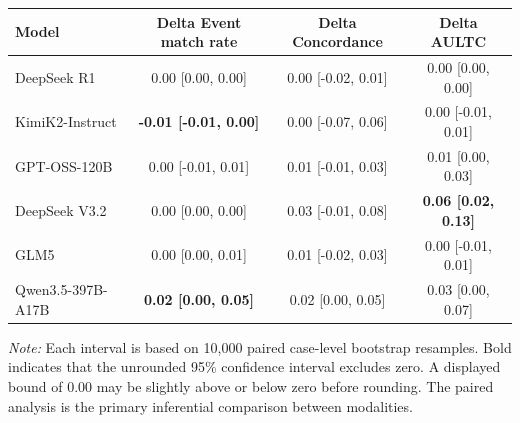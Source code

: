 \par\medskip
\noindent\begin{minipage}{\textwidth}
\small
\vspace{0.3em}
\centering
\setlength{\tabcolsep}{5pt}
\begin{tabular}{@{}lccc@{}}
\toprule
\textbf{Model} & \textbf{Delta Event match rate} & \textbf{Delta Concordance} & \textbf{Delta AULTC} \\
\midrule
DeepSeek R1 & 0.00 [0.00, 0.00] & 0.00 [-0.02, 0.01] & 0.00 [0.00, 0.00] \\
KimiK2-Instruct & \textbf{-0.01 [-0.01, 0.00]} & 0.00 [-0.07, 0.06] & 0.00 [-0.01, 0.01] \\
GPT-OSS-120B & 0.00 [-0.01, 0.01] & 0.01 [-0.01, 0.03] & 0.01 [0.00, 0.03] \\
DeepSeek V3.2 & 0.00 [0.00, 0.00] & 0.03 [-0.01, 0.08] & \textbf{0.06 [0.02, 0.13]} \\
GLM5 & 0.00 [0.00, 0.01] & 0.01 [-0.02, 0.03] & 0.00 [-0.01, 0.01] \\
Qwen3.5-397B-A17B & \textbf{0.02 [0.00, 0.05]} & 0.02 [0.00, 0.05] & 0.03 [0.00, 0.07] \\
\bottomrule
\end{tabular}
\par\vspace{0.3em}
\begin{minipage}{\textwidth}
\footnotesize\textit{Note:} Each interval is based on 10,000 paired case-level bootstrap resamples. Bold indicates that the unrounded 95\% confidence interval excludes zero. A displayed bound of 0.00 may be slightly above or below zero before rounding. The paired analysis is the primary inferential comparison between modalities.
\end{minipage}
\end{minipage}\par\medskip

